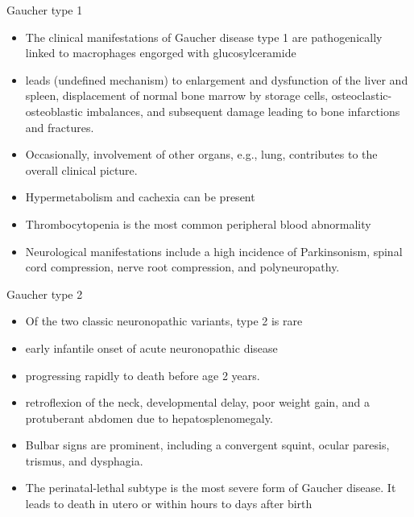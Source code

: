 \documentclass[presentation, smaller]{beamer}
\begin{document}
\begin{frame}[label={sec:orgheadline10}]{Gaucher type 1}
\begin{itemize}
\item The clinical manifestations of Gaucher disease type 1 are
pathogenically linked to macrophages engorged with glucosylceramide

\item leads (undefined mechanism) to enlargement and dysfunction of the
liver and spleen, displacement of normal bone marrow by storage
cells, osteoclastic-osteoblastic imbalances, and subsequent damage
leading to bone infarctions and fractures.

\item Occasionally, involvement of other organs, e.g., lung, contributes
to the overall clinical picture.

\item Hypermetabolism and cachexia can be present

\item Thrombocytopenia is the most common peripheral blood abnormality

\item Neurological manifestations include a high incidence of Parkinsonism,
spinal cord compression, nerve root compression, and polyneuropathy.
\end{itemize}
\end{frame}

\begin{frame}[label={sec:orgheadline11}]{Gaucher type 2}
\begin{itemize}
\item Of the two classic neuronopathic variants, type 2 is rare
\item early infantile onset of acute neuronopathic disease
\item progressing rapidly to death before age 2 years.

\item retroflexion of the neck, developmental delay, poor weight gain,
and a protuberant abdomen due to hepatosplenomegaly.
\item Bulbar signs are prominent, including a convergent squint, ocular paresis, trismus, and dysphagia.
\item The perinatal-lethal subtype is the most severe form of Gaucher
disease. It leads to death in utero or within hours to days after
birth
\end{itemize}
\end{frame}
\end{document}
